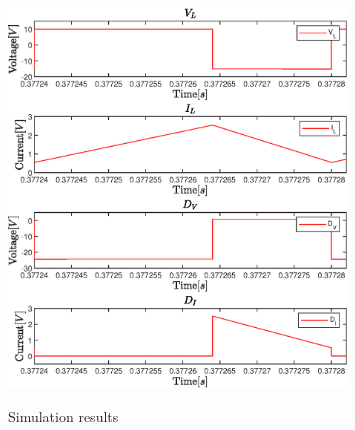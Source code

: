 \begin{figure}[H]%
    \centering
    {{\includegraphics[width=0.8\textwidth]{figures/aConventionalBoost/CBC_V_LtoI_D.eps} }}%
    \qquad
    \caption{Simulation results}%
     \label{fig:CBC_SimResults}%
\end{figure}